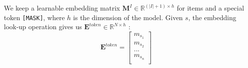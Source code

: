 We keep a learnable embedding matrix $\mathbf{M}^I \in \mathbb{R}^{(|I|+1) \times h}$ for items and a special token \verb|[MASK]|, where $h$ is the dimension of the model. Given $s$, the embedding look-up operation gives us $\mathbf{E}^{token} \in \mathbb{R}^{N \times h}$ :
\begin{displaymath}
  \mathbf{E}^{token} = \begin{bmatrix}
                    m_{s_1}\\
                    m_{s_2}\\
                    ...\\
                    m_{s_n}\\
                    \end{bmatrix}
\end{displaymath}